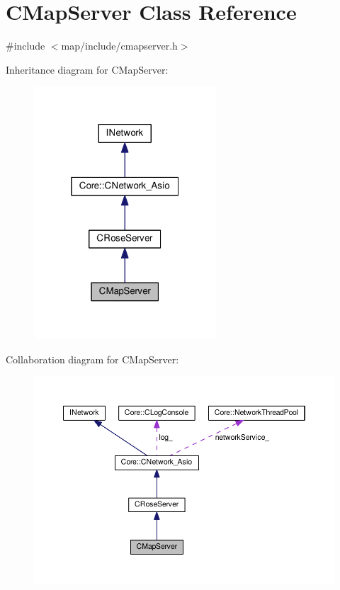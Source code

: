 \hypertarget{classCMapServer}{}\section{C\+Map\+Server Class Reference}
\label{classCMapServer}


{\ttfamily \#include $<$map/include/cmapserver.\+h$>$}



Inheritance diagram for C\+Map\+Server\+:
\nopagebreak
\begin{figure}[H]
\begin{center}
\leavevmode
\includegraphics[width=193pt]{classCMapServer__inherit__graph}
\end{center}
\end{figure}


Collaboration diagram for C\+Map\+Server\+:
\nopagebreak
\begin{figure}[H]
\begin{center}
\leavevmode
\includegraphics[width=350pt]{classCMapServer__coll__graph}
\end{center}
\end{figure}
